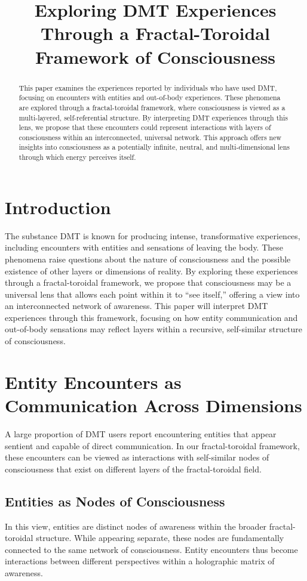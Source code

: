 \documentclass{article}
\title{Exploring DMT Experiences Through a Fractal-Toroidal Framework of Consciousness}
\author{}
\date{}
\begin{document}
\maketitle

\begin{abstract}
This paper examines the experiences reported by individuals who have used DMT, focusing on encounters with entities and out-of-body experiences. These phenomena are explored through a fractal-toroidal framework, where consciousness is viewed as a multi-layered, self-referential structure. By interpreting DMT experiences through this lens, we propose that these encounters could represent interactions with layers of consciousness within an interconnected, universal network. This approach offers new insights into consciousness as a potentially infinite, neutral, and multi-dimensional lens through which energy perceives itself.
\end{abstract}

\section{Introduction}
The substance DMT is known for producing intense, transformative experiences, including encounters with entities and sensations of leaving the body. These phenomena raise questions about the nature of consciousness and the possible existence of other layers or dimensions of reality. By exploring these experiences through a fractal-toroidal framework, we propose that consciousness may be a universal lens that allows each point within it to “see itself,” offering a view into an interconnected network of awareness. This paper will interpret DMT experiences through this framework, focusing on how entity communication and out-of-body sensations may reflect layers within a recursive, self-similar structure of consciousness.

\section{Entity Encounters as Communication Across Dimensions}
A large proportion of DMT users report encountering entities that appear sentient and capable of direct communication. In our fractal-toroidal framework, these encounters can be viewed as interactions with self-similar nodes of consciousness that exist on different layers of the fractal-toroidal field.

\subsection{Entities as Nodes of Consciousness}
In this view, entities are distinct nodes of awareness within the broader fractal-toroidal structure. While appearing separate, these nodes are fundamentally connected to the same network of consciousness. Entity encounters thus become interactions between different perspectives within a holographic matrix of awareness.
\end{document}
